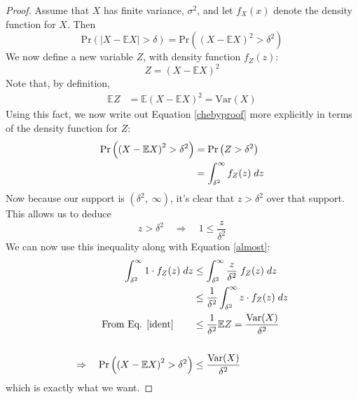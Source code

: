 \documentclass[a4paper,12pt]{scrartcl}
\begin{document}
\begin{proof} Assume that $X$ has finite variance, 
    $\sigma^2$, and let $f_X(x)$ denote the density function
    for $X$. Then 
    \begin{equation}
        \label{chebyproof}
        \text{Pr}\left(\left\lvert X - \mathbb{E}X 
            \right\rvert > \delta\right)
            = \text{Pr}\left(\left( X - \mathbb{E}X
            \right)^2 > \delta^2\right)
    \end{equation}
    We now define a new variable $Z$, with density function
    $f_Z(z)$:
    \begin{equation}
        \label{ident}
         Z = \left(X - \mathbb{E}X\right)^2 
    \end{equation}
    Note that, by definition,
    \begin{align*}
        \mathbb{E}Z &= \mathbb{E}\left(X - \mathbb{E}X\right)^2 
        = \text{Var}(X)
    \end{align*}
    Using this fact,
    we now write out Equation \ref{chebyproof} more explicitly
    in terms of the density function for $Z$:
    \begin{align}
        \text{Pr}\left(\left( X - \mathbb{E}X
            \right)^2 > \delta^2\right) &=
        \text{Pr}\left(Z > \delta^2\right) \notag \\
            &= \int_{\delta^2}^\infty f_Z(z) \; dz
            \label{almost}
    \end{align}
    Now because our support is $(\delta^2, \; \infty)$, it's 
    clear that $z > \delta^2$ over that support. This allows
    us to deduce
        \[ z > \delta^2 \quad \Rightarrow \quad
            1 \leq \frac{z}{\delta^2} \]
    We can now use this inequality along with Equation
    \ref{almost}:
    \begin{align*}
        \int_{\delta^2}^\infty 1 \cdot f_Z(z) \; dz
            &\leq 
            \int_{\delta^2}^\infty \frac{z}{\delta^2} \;
                f_Z(z) \; dz \\
        &\leq \frac{1}{\delta^2} \int_{\delta^2}^\infty  
                z \cdot f_Z(z) \; dz \\
        \text{From Eq. \ref{ident}} \qquad 
            &\leq \frac{1}{\delta^2} 
            \mathbb{E}Z =  \frac{\text{Var}(X)}{\delta^2} \\\\
        \Rightarrow \quad
        \text{Pr}\left(\left( X - \mathbb{E}X
            \right)^2 > \delta^2\right) &\leq
            \frac{\text{Var}(X)}{\delta^2} 
    \end{align*}
    which is exactly what we want.

\end{proof}
\end{document}
